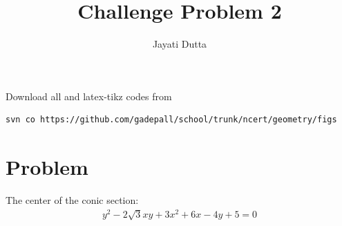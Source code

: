 \documentclass[journal,12pt,twocolumn]{IEEEtran}
\begin{document}
\let\StandardTheFigure\thefigure
\let\vec\mathbf
\renewcommand{\thefigure}{\theproblem}



\def\putbox#1#2#3{\makebox[0in][l]{\makebox[#1][l]{}\raisebox{\baselineskip}[0in][0in]{\raisebox{#2}[0in][0in]{#3}}}}
     \def\rightbox#1{\makebox[0in][r]{#1}}
     \def\centbox#1{\makebox[0in]{#1}}
     \def\topbox#1{\raisebox{-\baselineskip}[0in][0in]{#1}}
     \def\midbox#1{\raisebox{-0.5\baselineskip}[0in][0in]{#1}}

\vspace{3cm}


\title{Challenge Problem 2}
\author{Jayati Dutta}





\maketitle

\newpage


\bigskip

\renewcommand{\thefigure}{\theenumi}
\renewcommand{\thetable}{\theenumi}



%

Download all and latex-tikz codes from 
%
\begin{lstlisting}
svn co https://github.com/gadepall/school/trunk/ncert/geometry/figs
\end{lstlisting}
%


\section{Problem}
The center of the conic section:
\begin{align}
y^2 - 2\sqrt{3}xy + 3x^2 +6x -4y +5 =0
\end{align}
\end{document}
